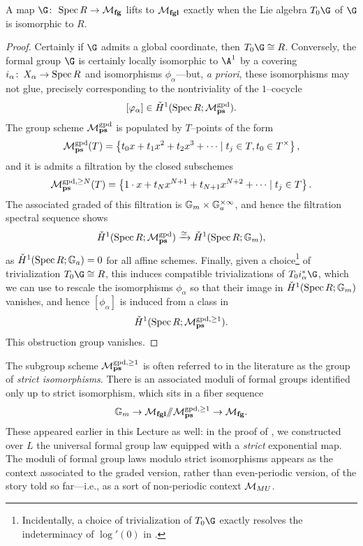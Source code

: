 \begin{lemma}\label{CoordinatizbleFGs}
A map $\G\co \Spec R \to \moduli{fg}$ lifts to $\mathcal{M}_{\mathbf{fgl}}$ exactly when the Lie algebra $T_0 \G$ of $\G$ is isomorphic to $R$.
\end{lemma}
\begin{proof}
Certainly if $\G$ admits a global coordinate, then $T_0 \G \cong R$.  Conversely, the formal group $\G$ is certainly locally isomorphic to $\A^1$ by a covering $i_\alpha\colon\thinspace X_\alpha \to \operatorname{Spec} R$ and isomorphisms $\phi_\alpha$---but, \textit{a priori}, these isomorphisms may not glue, precisely corresponding to the nontriviality of the {\Cech} $1$--cocycle \[[\varphi_\alpha] \in \check{H}^1(\operatorname{Spec} R; \mathcal{M}_{\mathbf{ps}}^{\mathrm{gpd}}).\]  The group scheme $\mathcal{M}_{\mathbf{ps}}^{\mathrm{gpd}}$ is populated by $T$--points of the form \[\mathcal{M}_{\mathbf{ps}}^{\mathrm{gpd}}(T) = \left\{ t_0 x + t_1 x^2 + t_2 x^3 + \cdots \mid t_j \in T, t_0 \in T^\times \right\},\] and it is admits a filtration by the closed subschemes \[\mathcal{M}_{\mathbf{ps}}^{\mathrm{gpd}, \ge N}(T) = \left\{ 1 \cdot x + t_N x^{N+1} + t_{N+1} x^{N+2} + \cdots \mid t_j \in T \right\}.\]  The associated graded of this filtration is $\mathbb G_m \times \mathbb G_a^{\times \infty}$, and hence the filtration spectral sequence shows \[\check{H}^1(\operatorname{Spec} R; \mathcal{M}_{\mathbf{ps}}^{\mathrm{gpd}}) \xrightarrow{\simeq} \check{H}^1(\operatorname{Spec} R; \mathbb G_m),\] as $\check{H}^1(\operatorname{Spec} R; \mathbb G_a) = 0$ for all affine schemes.  Finally, given a choice\footnote{Incidentally, a choice of trivialization of $T_0 \G$ exactly resolves the indeterminacy of $\log'(0)$ in .} of trivialization $T_0 \G \cong R$, this induces compatible trivializations of $T_0 i_\alpha^* \G$, which we can use to rescale the isomorphisms $\phi_\alpha$ so that their image in $\check{H}^1(\operatorname{Spec} R; \mathbb G_m)$ vanishes, and hence $[\phi_\alpha]$ is induced from a class in \[\check{H}^1(\operatorname{Spec} R; \mathcal{M}_{\mathbf{ps}}^{\mathrm{gpd}, \ge 1}).\]  This obstruction group vanishes.
\end{proof}

\begin{remark}\label{StrictIsosRemark}
The subgroup scheme $\mathcal{M}_{\mathbf{ps}}^{\mathrm{gpd}, \ge 1}$ is often referred to in the literature as the group of \textit{strict isomorphisms}.  There is an associated moduli of formal groups identified only up to strict isomorphism, which sits in a fiber sequence \[\mathbb G_m \to \mathcal{M}_{\mathbf{fgl}} /\!\!/ \mathcal{M}_{\mathbf{ps}}^{\mathrm{gpd}, \ge 1} \to \mathcal{M}_{\mathbf{fg}}.\]  These appeared earlier in this Lecture as well: in the proof of , we constructed over $L$ the universal formal group law equipped with a \emph{strict} exponential map.  The moduli of formal group laws modulo strict isomorphisms appears as the context associated to the graded version, rather than even-periodic version, of the story told so far---i.e., as a sort of non-periodic context $\mathcal{M}_{MU}$.
\end{remark}












